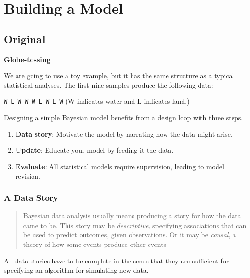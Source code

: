 \documentclass[
  letterpaper,
  DIV=11,
  numbers=noendperiod]{scrreprt}
\providecommand{\tightlist}{%
  \setlength{\itemsep}{0pt}\setlength{\parskip}{0pt}}\usepackage{longtable,booktabs,array}
\begin{document}
\hypertarget{building-a-model}{%
\section{Building a Model}\label{building-a-model}}

\hypertarget{original-2}{%
\subsection{Original}\label{original-2}}

\textbf{Globe-tossing}

We are going to use a toy example, but it has the same structure as a
typical statistical analyses. The first nine samples produce the
following data:

\texttt{W\ L\ W\ W\ W\ L\ W\ L\ W} (W indicates water and L indicates
land.)

Designing a simple Bayesian model benefits from a design loop with three
steps.

\begin{enumerate}
\def\labelenumi{\arabic{enumi}.}
\tightlist
\item
  \textbf{Data story}: Motivate the model by narrating how the data
  might arise.
\item
  \textbf{Update}: Educate your model by feeding it the data.
\item
  \textbf{Evaluate}: All statistical models require supervision, leading
  to model revision.
\end{enumerate}

\hypertarget{a-data-story}{%
\subsubsection{A Data Story}\label{a-data-story}}

\begin{quote}
Bayesian data analysis usually means producing a story for how the data
came to be. This story may be \emph{descriptive}, specifying
associations that can be used to predict outcomes, given observations.
Or it may be \emph{causal}, a theory of how some events produce other
events.
\end{quote}

All data stories have to be complete in the sense that they are
sufficient for specifying an algorithm for simulating new data.
\end{document}

